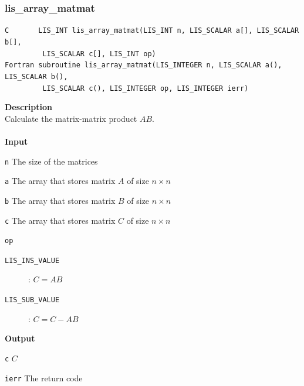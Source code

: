 \documentclass[a4paper]{article}
\newcommand{\namelistlabel}[1]{\mbox{#1}\hfill}
\newenvironment{namelist}[1]{%
\begin{list}{}
  {\let\makelabel\namelistlabel
  \settowidth{\labelwidth}{#1}
  \setlength{\leftmargin}{1.1\labelwidth}}
  }{%
\end{list}}
\begin{document}
\subsubsection{lis\_array\_matmat}
\begin{screen}
\verb|C       LIS_INT lis_array_matmat(LIS_INT n, LIS_SCALAR a[], LIS_SCALAR b[],|\\
\verb|         LIS_SCALAR c[], LIS_INT op)|\\
\verb|Fortran subroutine lis_array_matmat(LIS_INTEGER n, LIS_SCALAR a(), LIS_SCALAR b(),|\\
\verb|         LIS_SCALAR c(), LIS_INTEGER op, LIS_INTEGER ierr)|
\end{screen}
{\bf Description}\\
\indent
Calculate the matrix-matrix product $AB$.
\\ \\
\noindent
{\bf Input}
\begin{namelist}{XXXXXXXXXXXXXXXXXXXX}
\item[\tt n] The size of the matrices
\item[\tt a] The array that stores matrix $A$ of size $n \times n$
\item[\tt b] The array that stores matrix $B$ of size $n \times n$
\item[\tt c] The array that stores matrix $C$ of size $n \times n$
\item[\tt op] \begin{description}
\item[\tt LIS\_INS\_VALUE]: $C = AB$
\item[\tt LIS\_SUB\_VALUE]: $C = C - AB$
\end{description}
\end{namelist}
{\bf Output}
\begin{namelist}{XXXXXXXXXXXXXXXXXXXX}
\item[\tt c] $C$
\item[\tt ierr] The return code
\end{namelist}

\newpage
\end{document}
